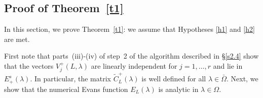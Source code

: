 \documentclass[10pt]{article}
\numberwithin{equation}{section}
\begin{document}

\subsection{Proof of Theorem~\ref{t1}}\label{s2.5}

In this section, we prove Theorem~\ref{t1}: we assume that Hypotheses \ref{h1} and \ref{h2} are met.

First note that parts~(iii)-(iv) of step~2 of the algorithm described in \S\ref{s2.4} show that the vectors $V^+_j(L,\lambda)$ are linearly independent for $j=1,\ldots,r$ and lie in $E^s_+(\lambda)$. In particular, the matrix $\tilde{C}^+_L(\lambda)$ is well defined for all $\lambda\in\bar\Omega$. Next, we show that the numerical Evans function $E_L(\lambda)$ is analytic in $\lambda\in\Omega$. 
\end{document}
